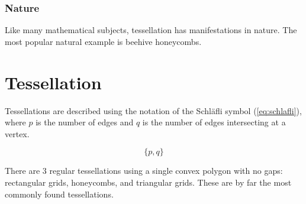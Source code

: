\documentclass[12pt,letterpaper]{article}
\begin{document}
\begin{figure}[H]
\begin{center}
\begin{subfigure}[b]{.3\linewidth}
        \end{subfigure}
    \end{center}
\end{figure}
\subsubsection{Nature}
Like many mathematical subjects, tessellation has manifestations in nature. The most popular natural example is beehive honeycombs.
\section{Tessellation}
Tessellations are described using the notation of the Schl\"afli symbol (\ref{eq:schlafli}), where $p$ is the number of edges and $q$ is the number of edges intersecting at a vertex.

\begin{equation}
    \label{eq:schlafli}
    \{p,q\}
\end{equation}

There are 3 regular tessellations using a single convex polygon with no gaps: rectangular grids, honeycombs, and triangular grids. These are by far the most commonly found tessellations.
\end{document}

